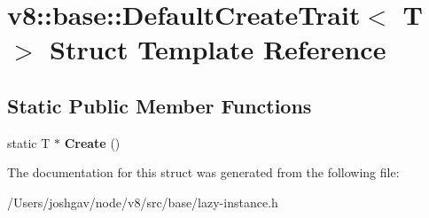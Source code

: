 \hypertarget{structv8_1_1base_1_1_default_create_trait}{}\section{v8\+:\+:base\+:\+:Default\+Create\+Trait$<$ T $>$ Struct Template Reference}
\label{structv8_1_1base_1_1_default_create_trait}
\subsection*{Static Public Member Functions}
\begin{DoxyCompactItemize}
\item 
static T $\ast$ {\bfseries Create} ()\hypertarget{structv8_1_1base_1_1_default_create_trait_a7129781d18e9d3d897de61a95b219ade}{}\label{structv8_1_1base_1_1_default_create_trait_a7129781d18e9d3d897de61a95b219ade}

\end{DoxyCompactItemize}


The documentation for this struct was generated from the following file\+:\begin{DoxyCompactItemize}
\item 
/\+Users/joshgav/node/v8/src/base/lazy-\/instance.\+h\end{DoxyCompactItemize}
